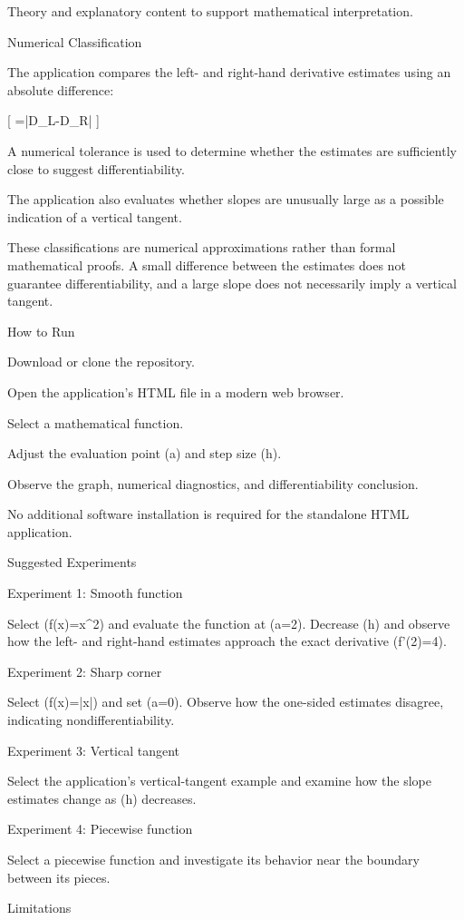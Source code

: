 Theory and explanatory content to support mathematical interpretation.

Numerical Classification

The application compares the left- and right-hand derivative estimates using an absolute difference:

[
\Delta=|D_L-D_R|
]

A numerical tolerance is used to determine whether the estimates are sufficiently close to suggest differentiability.

The application also evaluates whether slopes are unusually large as a possible indication of a vertical tangent.

These classifications are numerical approximations rather than formal mathematical proofs. A small difference between the estimates does not guarantee differentiability, and a large slope does not necessarily imply a vertical tangent.

How to Run

Download or clone the repository.

Open the application's HTML file in a modern web browser.

Select a mathematical function.

Adjust the evaluation point (a) and step size (h).

Observe the graph, numerical diagnostics, and differentiability conclusion.

No additional software installation is required for the standalone HTML application.

Suggested Experiments

Experiment 1: Smooth function

Select (f(x)=x^2) and evaluate the function at (a=2). Decrease (h) and observe how the left- and right-hand estimates approach the exact derivative (f'(2)=4).

Experiment 2: Sharp corner

Select (f(x)=|x|) and set (a=0). Observe how the one-sided estimates disagree, indicating nondifferentiability.

Experiment 3: Vertical tangent

Select the application's vertical-tangent example and examine how the slope estimates change as (h) decreases.

Experiment 4: Piecewise function

Select a piecewise function and investigate its behavior near the boundary between its pieces.

Limitations

